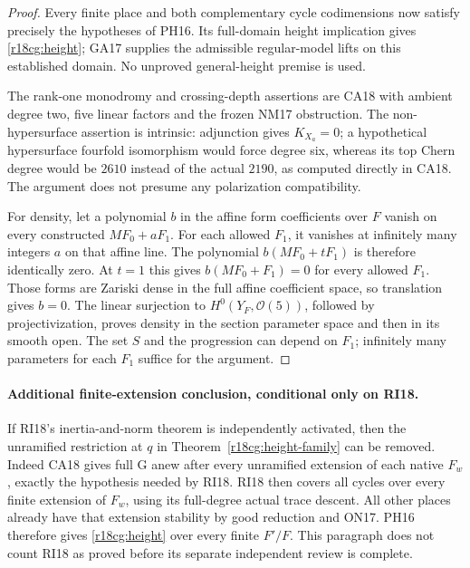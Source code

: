 \begin{proof}
Every finite place and both complementary cycle
codimensions now satisfy precisely the hypotheses
of PH16.  Its full-domain height implication gives
\eqref{r18cg:height}; GA17 supplies the admissible
regular-model lifts on this established domain.
No unproved general-height premise is used.

The rank-one monodromy and crossing-depth assertions
are CA18 with ambient degree two, five linear factors
and the frozen NM17 obstruction.  The non-hypersurface
assertion is intrinsic: adjunction gives $K_{X_a}=0$;
a hypothetical hypersurface fourfold isomorphism
would force degree six, whereas its top Chern degree
would be $2610$ instead of the actual $2190$, as
computed directly in CA18.  The argument does not
presume any polarization compatibility.

For density, let a polynomial $b$ in the affine form
coefficients over $F$ vanish on every constructed
$MF_0+aF_1$.  For each allowed $F_1$, it vanishes
at infinitely many integers $a$ on that affine line.
The polynomial $b(MF_0+tF_1)$ is therefore identically
zero.  At $t=1$ this gives $b(MF_0+F_1)=0$ for every
allowed $F_1$.  Those forms are Zariski dense in the
full affine coefficient space, so translation gives
$b=0$.  The linear surjection to
$H^0(Y_F,\mathcal O(5))$, followed by projectivization,
proves density in the section parameter space and
then in its smooth open.  The set $S$ and the
progression can depend on $F_1$; infinitely many
parameters for each $F_1$ suffice for the argument.
\end{proof}

\paragraph{Additional finite-extension conclusion, conditional only on RI18.}
If RI18's inertia-and-norm theorem is independently activated,
then the unramified restriction at $q$ in
Theorem~\ref{r18cg:height-family} can be removed.
Indeed CA18 gives full G anew after every unramified
extension of each native $F_w$, exactly the hypothesis
needed by RI18.  RI18 then covers all cycles over every
finite extension of $F_w$, using its full-degree actual
trace descent.  All other places already have that
extension stability by good reduction and ON17.
PH16 therefore gives \eqref{r18cg:height} over every
finite $F'/F$.  This paragraph does not count RI18 as
proved before its separate independent review is complete.

